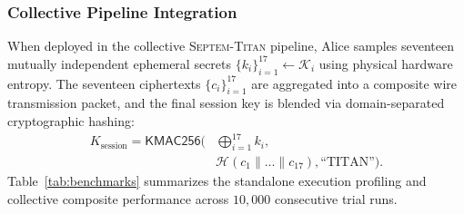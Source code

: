 \documentclass{ieeeaccess}
\begin{document}
\subsubsection{Collective Pipeline Integration}
When deployed in the collective \textsc{Septem-Titan} pipeline, Alice samples seventeen mutually independent ephemeral secrets $\{k_i\}_{i=1}^{17} \gets \mathcal{K}_i$ using physical hardware entropy. The seventeen ciphertexts $\{c_i\}_{i=1}^{17}$ are aggregated into a composite wire transmission packet, and the final session key is blended via domain-separated cryptographic hashing:
\begin{equation}
\begin{aligned}
  K_{\mathrm{session}} = \mathsf{KMAC256}\Big(&\bigoplus_{i=1}^{17} k_i, \\
  &\mathcal{H}(c_1 \parallel \dots \parallel c_{17}), \text{``TITAN''}\Big).
\end{aligned}
\end{equation}
Table~\ref{tab:benchmarks} summarizes the standalone execution profiling and collective composite performance across $10{,}000$ consecutive trial runs.
\end{document}
